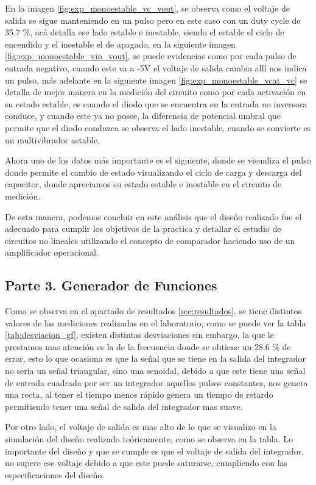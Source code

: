         En la imagen \ref{fig:exp_monoestable_vc_vout}, se observa como el voltaje de salida se sigue manteniendo en un pulso pero en este caso con un duty cycle de 35.7 \%, acá detalla ese lado estable e inestable, siendo el estable el ciclo de encendido y el inestable el de apagado, en la siguiente imagen \ref{fig:exp_monoestable_vin_vout}, se puede evidencias como por cada pulso de entrada negativo, cuando este va a -5V el voltaje de salida cambia allí nos indica un pulso, más adelante en la siguiente imagen \ref{fig:exp_monoestable_vcat_vc} se detalla de mejor manera en la medición del circuito como por cada activación en su estado estable, es cuando el diodo que se encuentra en la entrada no inversora conduce, y cuando este ya no posee, la diferencia de potencial umbral que permite que el diodo conduzca se observa el lado inestable, cuando se convierte es un multivibrador astable.

        Ahora uno de los datos más importante es el siguiente, donde se visualiza el pulso donde permite el cambio de estado visualizando el ciclo de carga y descarga del capacitor, donde apreciamos su estado estable e inestable en el circuito de medición.

        De esta manera, podemos concluir en este análisis que el diseño realizado fue el adecuado para cumplir los objetivos de la practica y detallar el estudio de  circuitos no lineales utilizando el concepto de comparador haciendo uso de un amplificador operacional. 

        

    \subsection{Parte 3. Generador de Funciones}
        Como se observa en el apartado de resultados \ref{sec:resultados}, se tiene distintos valores de las mediciones realizadas en el laboratorio, como se puede ver la tabla \ref{tab:desviacion_gf}, existen distintas desviaciones sin embargo, la que le prestamos mas atención es la de la frecuencia donde se obtiene un 28.6 \% de error, esto lo que ocasiona es que la señal que se tiene en la salida del integrador no seria un señal triangular, sino una senoidal, debido a que este tiene una señal de entrada cuadrada por ser un integrador aquellos pulsos constantes, nos genera una recta, al tener el tiempo menos rápido genera un tiempo de retardo permitiendo tener una señal de salida del integrador mas suave. 

        Por otro lado, el voltaje de salida es mas alto de lo que se visualizo en la simulación del diseño realizado teóricamente, como se observa en la tabla. Lo importante del diseño y que se cumple es que el voltaje de salida del integrador, no supere ese voltaje debido a que este puede saturarse, cumpliendo con las especificaciones del diseño.

